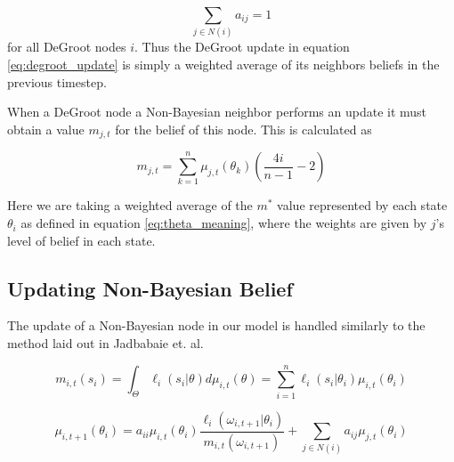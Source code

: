 \documentclass[a4paper,12pt]{article}
\begin{document}
\begin{equation}
\nonumber
\sum_{j \in N(i)} a_{ij} = 1
\end{equation}
for all DeGroot nodes $i$.  Thus the DeGroot update in equation \ref{eq:degroot_update} is simply a weighted average of its neighbors beliefs in the previous timestep.

When a DeGroot node a Non-Bayesian neighbor performs an update it must obtain a value 
$m_{j,t}$ for the belief of this node.  This is calculated as

\begin{equation}
m_{j,t} = \sum_{k=1}^n\mu_{j,t}(\theta_k)(\frac{4i}{n - 1} - 2)
\end{equation}

Here we are taking a weighted average of the $m^*$ value represented by each state $\theta_i$ as defined in equation \ref{eq:theta_meaning}, where the weights are given by $j$'s level of belief in each state.

\subsection{Updating Non-Bayesian Belief}

The update of a Non-Bayesian node in our model is handled similarly to the method laid out 
in Jadbabaie et. al. %


\begin{equation}
m_{i,t}(s_i) = \int_\Theta \ell_i(s_i|\theta)d\mu_{i,t}(\theta) = \sum_{i=1}^n \ell_i(s_i|\theta_i)\mu_{i,t}(\theta_i)
\end{equation}

\begin{equation}
\mu_{i,t+1}(\theta_i) = a_{ii}\mu_{i,t}(\theta_i)\frac{\ell_i(\omega_{i,t+1}|\theta_i)}{m_{i,t}(\omega_{i,t+1})} + \sum_{j \in N(i)} a_{ij}\mu_{j,t}(\theta_i)
\end{equation}





\end{document}

